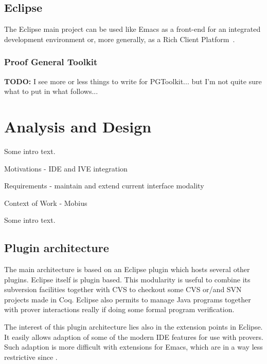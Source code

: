 \documentclass{entcs}
\newcommand{\todo}{\textbf{TODO: }}
\begin{document}
\subsection{Eclipse}
\label{subsec:eclipse}

The Eclipse main project can be used like Emacs as a front-end for an
integrated development environment or, more generally, as a Rich
Client Platform~\cite{eclipse-rcp}.

\subsubsection{Proof General Toolkit}
\label{subsubsec:proof-gener-toolk}

\todo{I see more or less things to write for PGToolkit... but I'm not quite
sure what to put in what follows...}\\

\section{Analysis and Design}
\label{sec:design}

Some intro text.

Motivations - IDE and IVE integration

Requirements - maintain and extend current interface modality %

Context of Work - Mobius %

Some intro text. %

\subsection{Plugin architecture}
\label{subsec:plugin-architecture}

The main architecture is based on an Eclipse plugin which hosts
several other plugins.  Eclipse itself is plugin based.  This
modularity is useful to combine its subversion facilities together
with CVS to checkout some CVS or/and SVN projects made in Coq.
Eclipse also permits to manage Java programs together with prover
interactions really if doing some formal program verification.

The interest of this plugin architecture lies also in the extension
points in Eclipse.  It easily allows adaption of some of the modern
IDE features for use with provers.  Such adaption is more difficult
with extensions for Emacs, which are in a way less restrictive since .
\end{document}
